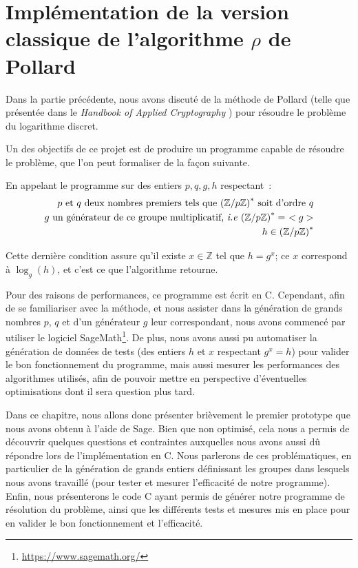 \chapter{Implémentation de la version classique de l'algorithme \texorpdfstring{$\rho$}{Rho} de Pollard}
    Dans la partie précédente, nous avons discuté de la méthode de Pollard (telle que présentée dans le \textit{Handbook of Applied Cryptography} \autocite[106]{handbook}) pour résoudre le problème du logarithme discret.

    Un des objectifs de ce projet est de produire un programme capable de résoudre le problème, que l'on peut formaliser de la façon suivante.

    En appelant le programme sur des entiers $p, q, g, h$ respectant~:
    \begin{equation} \label{eq:2}
      \begin{split}
        p \text{\ et } q \text{\ deux nombres premiers tels que } {(\mathbb{Z}/p\mathbb{Z})}^* \text{\ soit d'ordre } q \\
        g \text{\ un générateur de ce groupe multiplicatif, \textit{i.e} } {(\mathbb{Z}/p\mathbb{Z})}^* =\ < g > \\
        h \in {(\mathbb{Z}/p\mathbb{Z})}^*
      \end{split}
    \end{equation}

	  Cette dernière condition assure qu'il existe $x \in \mathbb{Z}$ tel que $h = g^x$; ce $x$ correspond à $\log_g(h)$, et c'est ce que l'algorithme retourne.

    Pour des raisons de performances, ce programme est écrit en C.
    Cependant, afin de se familiariser avec la méthode, et nous assister dans la génération de grands nombres $p$, $q$ et d'un générateur $g$ leur correspondant, nous avons commencé par utiliser le logiciel SageMath\footnote{\url{https://www.sagemath.org/}}. De plus, nous avons aussi pu automatiser la génération de données de tests (des entiers $h$ et $x$ respectant $g^x = h$) pour valider le bon fonctionnement du programme, mais aussi mesurer les performances des algorithmes utilisés, afin de pouvoir mettre en perspective d'éventuelles optimisations dont il sera question plus tard.

    Dans ce chapitre, nous allons donc présenter brièvement le premier prototype que nous avons obtenu à l'aide de Sage.
    Bien que non optimisé, cela nous a permis de découvrir quelques questions et contraintes auxquelles nous avons aussi dû répondre lors de l'implémentation en C.
    Nous parlerons de ces problématiques, en particulier de la génération de grands entiers définissant les groupes dans lesquels nous avons travaillé (pour tester et mesurer l'efficacité de notre programme).
    Enfin, nous présenterons le code C ayant permis de générer notre programme de résolution du problème, ainsi que les différents tests et mesures mis en place pour en valider le bon fonctionnement et l'efficacité.


